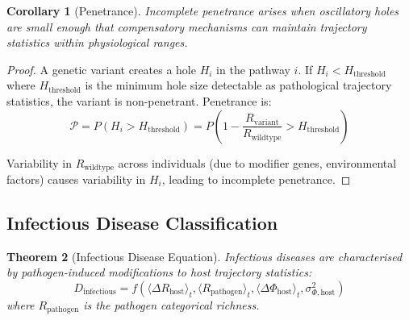 \documentclass[11pt,twocolumn,a4paper]{article}
\newtheorem{theorem}{Theorem}[section]
\newtheorem{corollary}[theorem]{Corollary}
\theoremstyle{definition}
\theoremstyle{remark}
\begin{document}
\begin{corollary}[Penetrance]
\label{cor:penetrance}
Incomplete penetrance arises when oscillatory holes are small enough that compensatory mechanisms can maintain trajectory statistics within physiological ranges.
\end{corollary}

\begin{proof}
A genetic variant creates a hole $H_i$ in the pathway $i$. If $H_i < H_{\mathrm{threshold}}$ where $H_{\mathrm{threshold}}$ is the minimum hole size detectable as pathological trajectory statistics, the variant is non-penetrant. Penetrance is:
\begin{equation}
\mathcal{P} = P(H_i > H_{\mathrm{threshold}}) = P\left(1 - \frac{R_{\mathrm{variant}}}{R_{\mathrm{wildtype}}} > H_{\mathrm{threshold}}\right)
\label{eq:penetrance}
\end{equation}

Variability in $R_{\mathrm{wildtype}}$ across individuals (due to modifier genes, environmental factors) causes variability in $H_i$, leading to incomplete penetrance.
\end{proof}

\subsection{Infectious Disease Classification}

\begin{theorem}[Infectious Disease Equation]
\label{thm:infectious_disease}
Infectious diseases are characterised by pathogen-induced modifications to host trajectory statistics:
\begin{equation}
D_{\mathrm{infectious}} = f\left(\langle\Delta R_{\mathrm{host}}\rangle_t, \langle R_{\mathrm{pathogen}}\rangle_t, \langle\Delta\Phi_{\mathrm{host}}\rangle_t, \sigma_{\Phi,\mathrm{host}}^2\right)
\label{eq:infectious_disease}
\end{equation}
where $R_{\mathrm{pathogen}}$ is the pathogen categorical richness.
\end{theorem}
\end{document}
